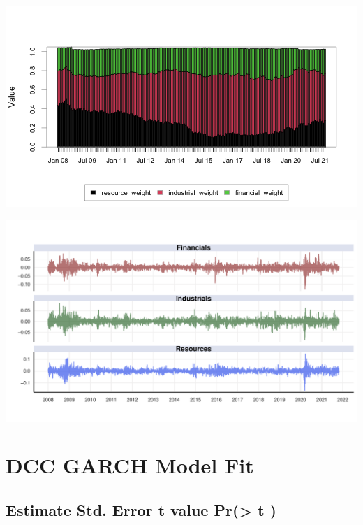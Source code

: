 \documentclass[11pt,preprint, authoryear]{elsarticle}
\let\origfigure\figure
\let\endorigfigure\endfigure
\renewenvironment{figure}[1][2] {
    \expandafter\origfigure\expandafter[H]
} {
    \endorigfigure
}
\numberwithin{equation}{section}
\numberwithin{figure}{section}
\numberwithin{table}{section}
\begin{document}
\begin{figure}[H]

{\centering \includegraphics{Paper_files/figure-latex/SWIX-1} 

}

\caption{SWIX Weight Contribution \label{SWIX}}\label{fig:SWIX}
\end{figure}

\begin{figure}[H]

{\centering \includegraphics{Paper_files/figure-latex/LogRet-1} 

}

\caption{Log Returns per Sector for the SWIX \label{LogRet}}\label{fig:LogRet}
\end{figure}

\hypertarget{dcc-garch-model-fit}{%
\section{DCC GARCH Model Fit}\label{dcc-garch-model-fit}}

\hypertarget{estimate-std.-error-t-value-pr-t}{%
\subsection{Estimate Std. Error t value Pr(\textgreater{} \textbar{}
t\textbar{} )}\label{estimate-std.-error-t-value-pr-t}}
\end{document}
